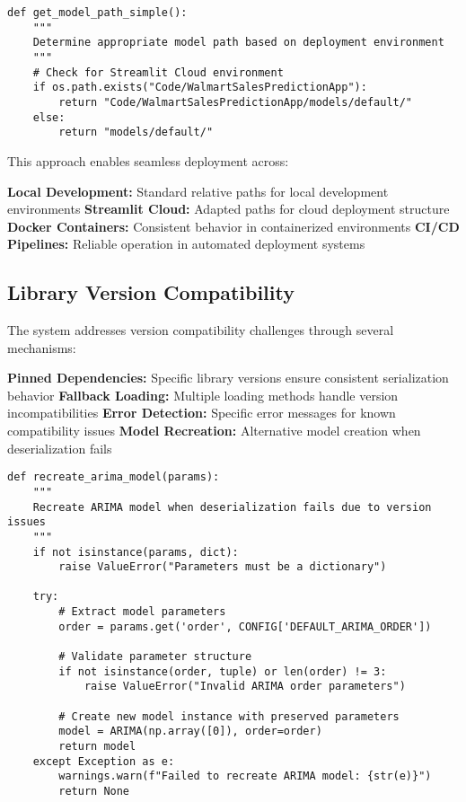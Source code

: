 \begin{lstlisting}[language=MyPython, caption={Dynamic Environment Detection}]
def get_model_path_simple():
    """
    Determine appropriate model path based on deployment environment
    """
    # Check for Streamlit Cloud environment
    if os.path.exists("Code/WalmartSalesPredictionApp"):
        return "Code/WalmartSalesPredictionApp/models/default/"
    else:
        return "models/default/"
\end{lstlisting}

This approach enables seamless deployment across:

\textbf{Local Development:} Standard relative paths for local development environments
\textbf{Streamlit Cloud:} Adapted paths for cloud deployment structure
\textbf{Docker Containers:} Consistent behavior in containerized environments
\textbf{CI/CD Pipelines:} Reliable operation in automated deployment systems

\subsection{Library Version Compatibility}

The system addresses version compatibility challenges through several mechanisms:

\textbf{Pinned Dependencies:} Specific library versions ensure consistent serialization behavior
\textbf{Fallback Loading:} Multiple loading methods handle version incompatibilities
\textbf{Error Detection:} Specific error messages for known compatibility issues
\textbf{Model Recreation:} Alternative model creation when deserialization fails

\begin{lstlisting}[language=MyPython, caption={Model Recreation Fallback for Version Compatibility}]
def recreate_arima_model(params):
    """
    Recreate ARIMA model when deserialization fails due to version issues
    """
    if not isinstance(params, dict):
        raise ValueError("Parameters must be a dictionary")
    
    try:
        # Extract model parameters
        order = params.get('order', CONFIG['DEFAULT_ARIMA_ORDER'])
        
        # Validate parameter structure
        if not isinstance(order, tuple) or len(order) != 3:
            raise ValueError("Invalid ARIMA order parameters")
        
        # Create new model instance with preserved parameters
        model = ARIMA(np.array([0]), order=order)
        return model
    except Exception as e:
        warnings.warn(f"Failed to recreate ARIMA model: {str(e)}")
        return None
\end{lstlisting}


